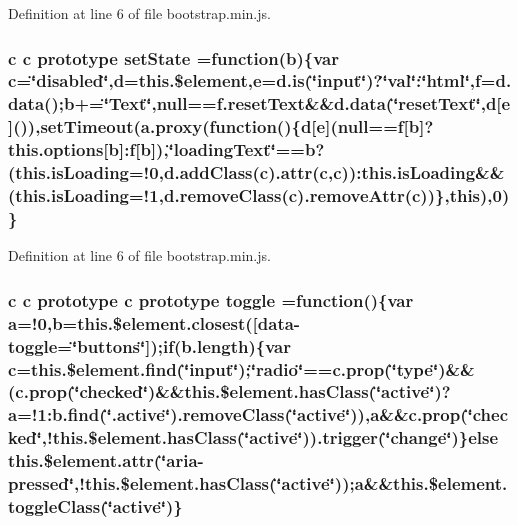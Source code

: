 Definition at line 6 of file bootstrap.\+min.\+js.

\subsubsection[{set\+State}]{ {\bf c} {\bf c} {\bf prototype} set\+State =function({\bf b})\{var {\bf c}=\char`\"{}disabled\char`\"{},d=this.\$element,{\bf e}=d.\+is(\char`\"{}input\char`\"{})?\char`\"{}val\char`\"{}\+:\char`\"{}{\bf html}\char`\"{},f={\bf d.\+data}();{\bf b}+=\char`\"{}Text\char`\"{},null==f.\+reset\+Text\&\&{\bf d.\+data}(\char`\"{}reset\+Text\char`\"{},d[{\bf e}]()),set\+Timeout(a.\+proxy(function()\{{\bf d}[{\bf e}](null=={\bf f}[{\bf b}]?{\bf this.\+options}[{\bf b}]\+:{\bf f}[{\bf b}]),\char`\"{}loading\+Text\char`\"{}==b?(this.\+is\+Loading=!0,d.\+add\+Class({\bf c}).{\bf attr}({\bf c},{\bf c}))\+:this.\+is\+Loading\&\&(this.\+is\+Loading=!1,d.\+remove\+Class({\bf c}).remove\+Attr({\bf c}))\},{\bf this}),0)\}}\label{bootstrap_8min_8js_a14f119ea3b5abc5536d590dfe1793c6e}


Definition at line 6 of file bootstrap.\+min.\+js.

\subsubsection[{toggle}]{ {\bf c} {\bf c} {\bf prototype} {\bf c} {\bf prototype} toggle =function()\{var {\bf a}=!0,{\bf b}=this.\$element.\+closest(\textquotesingle{}[{\bf data}-\/toggle=\char`\"{}buttons\char`\"{}]\textquotesingle{});if(b.\+length)\{var {\bf c}=this.\$element.\+find(\char`\"{}input\char`\"{});\char`\"{}radio\char`\"{}==c.\+prop(\char`\"{}type\char`\"{})\&\&(c.\+prop(\char`\"{}checked\char`\"{})\&\&this.\$element.\+has\+Class(\char`\"{}active\char`\"{})?a=!1\+:b.\+find(\char`\"{}.active\char`\"{}).remove\+Class(\char`\"{}active\char`\"{})),a\&\&c.\+prop(\char`\"{}checked\char`\"{},!this.\$element.\+has\+Class(\char`\"{}active\char`\"{})).trigger(\char`\"{}change\char`\"{})\}else {\bf this.\$element.\+attr}(\char`\"{}aria-\/pressed\char`\"{},!this.\$element.\+has\+Class(\char`\"{}active\char`\"{}));a\&\&this.\$element.\+toggle\+Class(\char`\"{}active\char`\"{})\}}\label{bootstrap_8min_8js_aa8e797a9bda5e7e313be3518054164a3}


